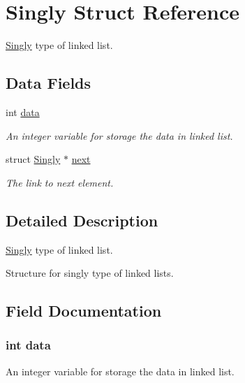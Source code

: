 \hypertarget{struct_singly}{}\section{Singly Struct Reference}
\label{struct_singly}


\hyperlink{struct_singly}{Singly} type of linked list.  


\subsection*{Data Fields}
\begin{DoxyCompactItemize}
\item 
int \hyperlink{struct_singly_a9eab91667db4d35c7231dcddf7b89a76}{data}
\begin{DoxyCompactList}\small\item\em An integer variable for storage the data in linked list. \end{DoxyCompactList}\item 
struct \hyperlink{struct_singly}{Singly} $\ast$ \hyperlink{struct_singly_a17f77df43a5e1b76dd03f97965a14f5f}{next}
\begin{DoxyCompactList}\small\item\em The link to next element. \end{DoxyCompactList}\end{DoxyCompactItemize}


\subsection{Detailed Description}
\hyperlink{struct_singly}{Singly} type of linked list. 

Structure for singly type of linked lists. 

\subsection{Field Documentation}
\subsubsection[{\texorpdfstring{data}{data}}]{\setlength{\rightskip}{0pt plus 5cm}int data}\hypertarget{struct_singly_a9eab91667db4d35c7231dcddf7b89a76}{}\label{struct_singly_a9eab91667db4d35c7231dcddf7b89a76}


An integer variable for storage the data in linked list. 

